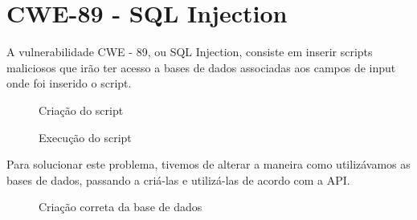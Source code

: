 \documentclass[12pt]{report}
\begin{document}
\newpage
\section{CWE-89 - SQL Injection} \label{89}
A vulnerabilidade CWE - 89, ou SQL Injection, consiste em inserir scripts maliciosos que irão ter acesso a bases de dados associadas aos campos de input onde foi inserido o script.

\begin{figure}[H]{
\centering
{
\caption{Criação do script}
}
}\end{figure}

\begin{figure}[H]{
\centering
{
\caption{Execução do script}
}
}\end{figure}

Para solucionar este problema, tivemos de alterar a maneira como utilizávamos as bases de dados, passando a criá-las e utilizá-las de acordo com a API.


\begin{figure}[H]{
\centering
{
\caption{Criação correta da base de dados}
}
}\end{figure}
\end{document}
